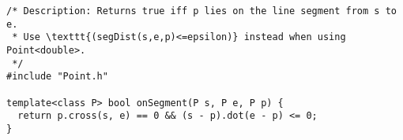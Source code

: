 \begin{verbatim}
/* Description: Returns true iff p lies on the line segment from s to e.
 * Use \texttt{(segDist(s,e,p)<=epsilon)} instead when using Point<double>.
 */
#include "Point.h"

template<class P> bool onSegment(P s, P e, P p) {
  return p.cross(s, e) == 0 && (s - p).dot(e - p) <= 0;
}
\end{verbatim}